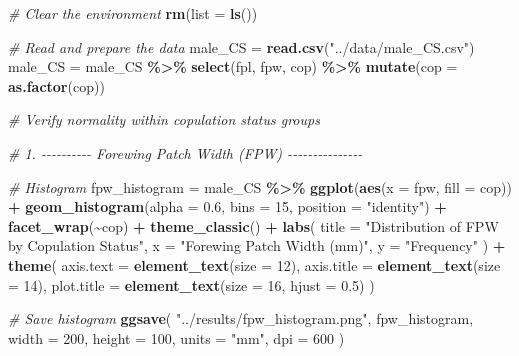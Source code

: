 \documentclass[
]{article}
\newenvironment{Shaded}{\begin{snugshade}}{\end{snugshade}}
\newcommand{\AttributeTok}[1]{\textcolor[rgb]{0.13,0.29,0.53}{#1}}
\newcommand{\CommentTok}[1]{\textcolor[rgb]{0.56,0.35,0.01}{\textit{#1}}}
\newcommand{\DecValTok}[1]{\textcolor[rgb]{0.00,0.00,0.81}{#1}}
\newcommand{\FloatTok}[1]{\textcolor[rgb]{0.00,0.00,0.81}{#1}}
\newcommand{\FunctionTok}[1]{\textcolor[rgb]{0.13,0.29,0.53}{\textbf{#1}}}
\newcommand{\NormalTok}[1]{#1}
\newcommand{\OtherTok}[1]{\textcolor[rgb]{0.56,0.35,0.01}{#1}}
\newcommand{\SpecialCharTok}[1]{\textcolor[rgb]{0.81,0.36,0.00}{\textbf{#1}}}
\newcommand{\StringTok}[1]{\textcolor[rgb]{0.31,0.60,0.02}{#1}}
\begin{document}
\begin{Shaded}
\begin{Highlighting}[]
\CommentTok{\# Clear the environment}
\FunctionTok{rm}\NormalTok{(}\AttributeTok{list =} \FunctionTok{ls}\NormalTok{())}

\CommentTok{\# Read and prepare the data}
\NormalTok{male\_CS }\OtherTok{=} \FunctionTok{read.csv}\NormalTok{(}\StringTok{"../data/male\_CS.csv"}\NormalTok{)}
\NormalTok{male\_CS }\OtherTok{=}\NormalTok{ male\_CS }\SpecialCharTok{\%\textgreater{}\%} 
  \FunctionTok{select}\NormalTok{(fpl, fpw, cop) }\SpecialCharTok{\%\textgreater{}\%} 
  \FunctionTok{mutate}\NormalTok{(}\AttributeTok{cop =} \FunctionTok{as.factor}\NormalTok{(cop))}

\CommentTok{\# Verify normality within copulation status groups}

\CommentTok{\# 1. {-}{-}{-}{-}{-}{-}{-}{-}{-}{-} Forewing Patch Width (FPW) {-}{-}{-}{-}{-}{-}{-}{-}{-}{-}{-}{-}{-}{-}{-}}

\CommentTok{\# Histogram}
\NormalTok{fpw\_histogram }\OtherTok{=}\NormalTok{ male\_CS }\SpecialCharTok{\%\textgreater{}\%}
  \FunctionTok{ggplot}\NormalTok{(}\FunctionTok{aes}\NormalTok{(}\AttributeTok{x =}\NormalTok{ fpw, }\AttributeTok{fill =}\NormalTok{ cop)) }\SpecialCharTok{+}
  \FunctionTok{geom\_histogram}\NormalTok{(}\AttributeTok{alpha =} \FloatTok{0.6}\NormalTok{, }\AttributeTok{bins =} \DecValTok{15}\NormalTok{, }\AttributeTok{position =} \StringTok{"identity"}\NormalTok{) }\SpecialCharTok{+}
  \FunctionTok{facet\_wrap}\NormalTok{(}\SpecialCharTok{\textasciitilde{}}\NormalTok{cop) }\SpecialCharTok{+}
  \FunctionTok{theme\_classic}\NormalTok{() }\SpecialCharTok{+}
  \FunctionTok{labs}\NormalTok{(}
    \AttributeTok{title =} \StringTok{"Distribution of FPW by Copulation Status"}\NormalTok{, }
    \AttributeTok{x =} \StringTok{"Forewing Patch Width (mm)"}\NormalTok{, }
    \AttributeTok{y =} \StringTok{"Frequency"}
\NormalTok{  ) }\SpecialCharTok{+}
  \FunctionTok{theme}\NormalTok{(}
    \AttributeTok{axis.text =} \FunctionTok{element\_text}\NormalTok{(}\AttributeTok{size =} \DecValTok{12}\NormalTok{),}
    \AttributeTok{axis.title =} \FunctionTok{element\_text}\NormalTok{(}\AttributeTok{size =} \DecValTok{14}\NormalTok{),}
    \AttributeTok{plot.title =} \FunctionTok{element\_text}\NormalTok{(}\AttributeTok{size =} \DecValTok{16}\NormalTok{, }\AttributeTok{hjust =} \FloatTok{0.5}\NormalTok{)}
\NormalTok{  )}

\CommentTok{\# Save histogram}
\FunctionTok{ggsave}\NormalTok{(}
  \StringTok{"../results/fpw\_histogram.png"}\NormalTok{,}
\NormalTok{  fpw\_histogram,}
  \AttributeTok{width =} \DecValTok{200}\NormalTok{,}
  \AttributeTok{height =} \DecValTok{100}\NormalTok{,}
  \AttributeTok{units =} \StringTok{"mm"}\NormalTok{,}
  \AttributeTok{dpi =} \DecValTok{600}
\NormalTok{)}


\end{Highlighting}
\end{Shaded}
\end{document}
